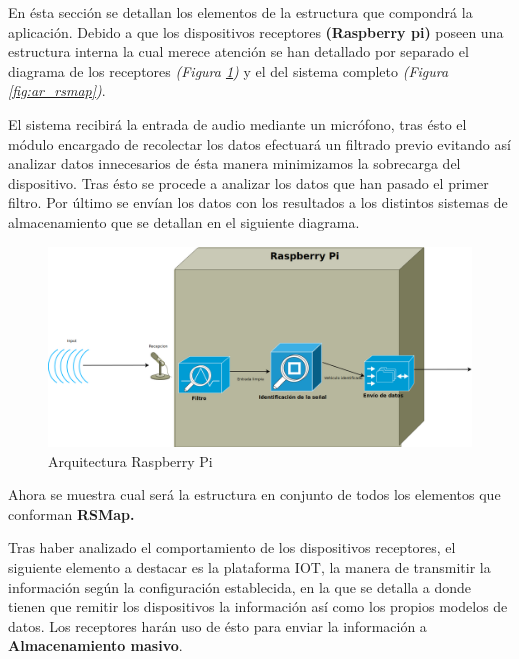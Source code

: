 En ésta sección se detallan los elementos de la estructura que compondrá la aplicación. Debido a que los dispositivos receptores \textbf{(Raspberry pi)} poseen una estructura interna la cual merece atención se han detallado por separado el diagrama de los receptores \textit{(Figura \ref{fig:ar_rpi})} y el del sistema completo \textit{(Figura \ref{fig:ar_rsmap})}.

\bigskip

El sistema recibirá la entrada de audio mediante un micrófono, tras ésto el módulo encargado de recolectar los datos efectuará un filtrado previo evitando así analizar datos innecesarios de ésta manera minimizamos la sobrecarga del dispositivo. Tras ésto se procede a analizar los datos que han pasado el primer filtro. Por último se envían los datos con los resultados a los distintos sistemas de almacenamiento que se detallan en el siguiente diagrama.

\bigskip

\begin{figure}[!ht]
  \begin{center}
  \includegraphics[scale=0.25]{../images/diag_plan/diag_arqu_pi.png}
  \caption{Arquitectura Raspberry Pi}
  \label{fig:ar_rpi}
  \end{center}
\end{figure}

\newpage

Ahora se muestra cual será la estructura en conjunto de todos los elementos que conforman \textbf{RSMap.}


Tras haber analizado el comportamiento de los dispositivos receptores, el siguiente elemento a destacar es la plataforma IOT, la manera de transmitir la información según la configuración establecida, en la que se detalla a donde tienen que remitir los dispositivos la información así como los propios modelos de datos. Los receptores harán uso de ésto para enviar la información a \textbf{Almacenamiento masivo}.

